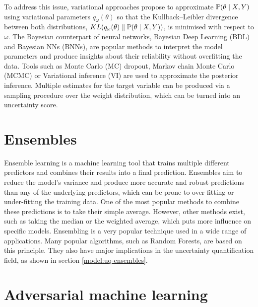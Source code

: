 To address this issue, variational approaches propose to approximate $\operatorname{\mathbb{P}}(\theta \mid X, Y)$ using variational parameters $q_\omega(\theta)$ so that the Kullback–Leibler divergence between both distributions, $KL(q_\omega(\theta) \parallel \operatorname{\mathbb{P}}(\theta \mid X, Y) )$, is minimised with respect to $\omega$. 
The Bayesian counterpart of neural networks, Bayesian Deep Learning (BDL) and Bayesian NNs (BNNs), are popular methods to interpret the model parameters and produce insights about their reliability without overfitting the data. Tools such as Monte Carlo (MC) dropout\cite{dropoutDeepNets}, Markov chain Monte Carlo (MCMC) or Variational inference (VI) are used to approximate the posterior inference. Multiple estimates for the target variable can be produced via a sampling procedure over the weight distribution, which can be turned into an uncertainty score.
 

\section{Ensembles} \label{section:background:ensembles}

Ensemble learning is a machine learning tool that trains multiple different predictors and combines their results into a final prediction. Ensembles aim to reduce the model's variance and produce more accurate and robust predictions than any of the underlying predictors, which can be prone to over-fitting or under-fitting the training data. 
One of the most popular methods to combine these predictions is to take their simple average. However, other methods exist, such as taking the median or the weighted average, which puts more influence on specific models.
Ensembling is a very popular technique used in a wide range of applications. Many popular algorithms, such as Random Forests, are based on this principle. They also have major implications in the uncertainty quantification field, as shown in section \ref{model:uq-ensembles}.




\section{Adversarial machine learning}

